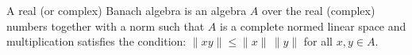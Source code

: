 A real (or complex) Banach algebra is an algebra $A$ over the real (complex) numbers together with a norm such that $A$ is a complete normed linear space and multiplication satisfies the condition: $\|xy\| \leq \|x\| \, \|y\|$ for all $x, y \in A$.
